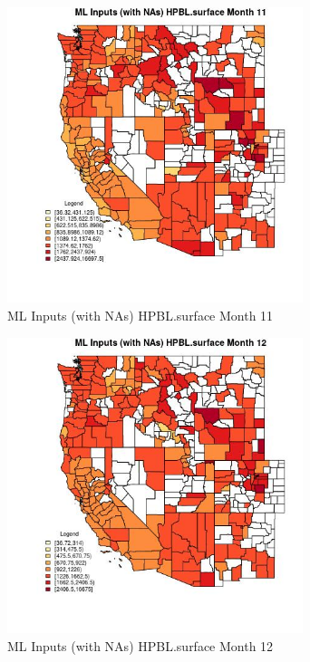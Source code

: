 \begin{figure} 
\centering  
\includegraphics[width=0.77\textwidth]{Code_Outputs/Report_ML_input_PM25_Step4_part_e_de_duplicated_aves_compiled_2019-05-21wNAs_CountyHPBLsurfacemedianMonth11.jpg} 
\caption{\label{fig:Report_ML_input_PM25_Step4_part_e_de_duplicated_aves_compiled_2019-05-21wNAsCountyHPBLsurfacemedianMonth11}ML Inputs (with NAs) HPBL.surface Month 11} 
\end{figure} 
 

\begin{figure} 
\centering  
\includegraphics[width=0.77\textwidth]{Code_Outputs/Report_ML_input_PM25_Step4_part_e_de_duplicated_aves_compiled_2019-05-21wNAs_CountyHPBLsurfacemedianMonth12.jpg} 
\caption{\label{fig:Report_ML_input_PM25_Step4_part_e_de_duplicated_aves_compiled_2019-05-21wNAsCountyHPBLsurfacemedianMonth12}ML Inputs (with NAs) HPBL.surface Month 12} 
\end{figure} 
 

